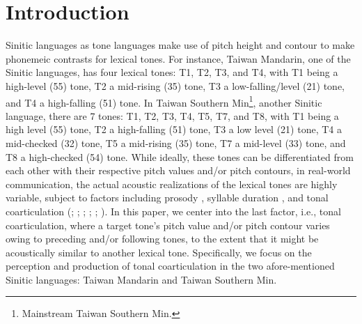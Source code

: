 
\chapter{Introduction}\label{chapter:Introduction}

Sinitic languages as tone languages make use of pitch height and contour to make phonemeic contrasts for lexical tones. For instance, Taiwan Mandarin, one of the Sinitic languages, has four lexical tones: T1, T2, T3, and T4, with T1 being a high-level (55) tone, T2 a mid-rising (35) tone, T3 a low-falling/level (21) tone, and T4 a high-falling (51) tone. In Taiwan Southern Min\footnote{Mainstream Taiwan Southern Min.}, another Sinitic language, there are 7 tones: T1, T2, T3, T4, T5, T7, and T8, with T1 being a high level (55) tone, T2 a high-falling (51) tone, T3 a low level (21) tone, T4 a mid-checked (32) tone, T5 a mid-rising (35) tone, T7 a mid-level (33) tone, and T8 a high-checked (54) tone. While ideally, these tones can be differentiated from each other with their respective pitch values and/or pitch contours, in real-world communication, the actual acoustic realizations of the lexical tones are highly variable, subject to factors including prosody \citep{Peng1997}, syllable duration \citep{XuWang2009}, and tonal coarticulation (\citealp{Shen1990}; \citealp{Xu1994}; \citealp{Peng1997}; \citeyear{Xu1997}; \citealp{Wang2002}; \citealp{ChangHsieh2012}). In this paper, we center into the last factor, i.e., tonal coarticulation, where a target tone's pitch value and/or pitch contour varies owing to preceding and/or following tones, to the extent that it might be acoustically similar to another lexical tone. Specifically, we focus on the perception and production of tonal coarticulation in the two afore-mentioned Sinitic languages: Taiwan Mandarin and Taiwan Southern Min.



